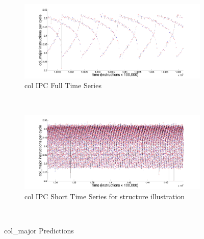 \documentclass{article}
\begin{document}
\begin{figure}
        \centering
        \begin{subfigure}{\textwidth}
                \includegraphics[width=\textwidth]{figs/colPredShortTS}
                \caption{col IPC  Full Time Series}
                \label{fig:gull}
        \end{subfigure}%
        \newline
        ~ %
        \begin{subfigure}[b]{\textwidth}
                \includegraphics[width=\textwidth]{figs/colPredfullTS}
                \caption{col IPC  Short Time Series for structure illustration}
                \label{fig:svdFullColored}
        \end{subfigure}

        ~ %
         \caption{col\_major Predictions }\label{fig:svdFull}
\end{figure}
\end{document}

